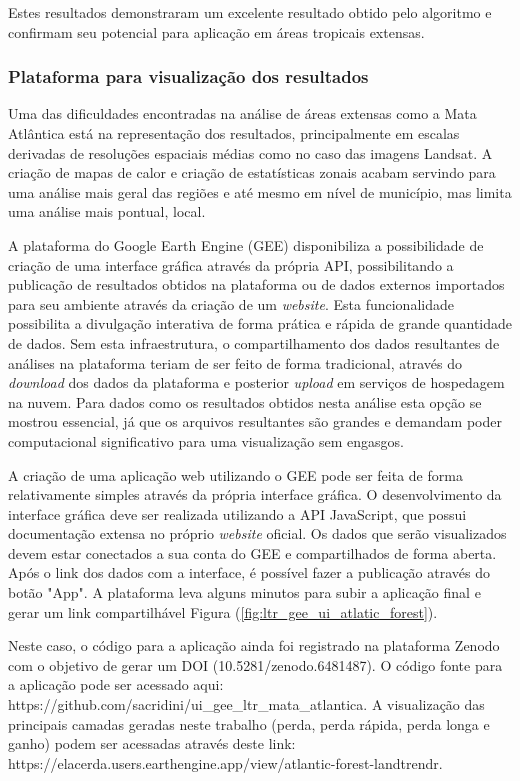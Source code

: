 Estes resultados demonstraram um excelente resultado obtido pelo algoritmo e confirmam seu potencial para aplicação em áreas tropicais extensas.

\subsubsection{Plataforma para visualização dos resultados}

\hspace{13pt} Uma das dificuldades encontradas na análise de áreas extensas como a Mata Atlântica está na representação dos resultados, principalmente em escalas derivadas de resoluções espaciais médias como no caso das imagens Landsat. A criação de mapas de calor e criação de estatísticas zonais acabam servindo para uma análise mais geral das regiões e até mesmo em nível de município, mas limita uma análise mais pontual, local.

A plataforma do Google Earth Engine (GEE) disponibiliza a possibilidade de criação de uma interface gráfica através da própria API, possibilitando a publicação de resultados obtidos na plataforma ou de dados externos importados para seu ambiente através da criação de um \textit{website}. Esta funcionalidade possibilita a divulgação interativa de forma prática e rápida de grande quantidade de dados. Sem esta infraestrutura, o compartilhamento dos dados resultantes de análises na plataforma teriam de ser feito de forma tradicional, através do \textit{download} dos dados da plataforma e posterior \textit{upload} em serviços de hospedagem na nuvem. Para dados como os resultados obtidos nesta análise esta opção se mostrou essencial, já que os arquivos resultantes são grandes e demandam poder computacional significativo para uma visualização sem engasgos. 

A criação de uma aplicação web utilizando o GEE pode ser feita de forma relativamente simples através da própria interface gráfica. O desenvolvimento da interface gráfica deve ser realizada utilizando a API JavaScript, que possui documentação extensa no próprio \textit{website} oficial. Os dados que serão visualizados devem estar conectados a sua conta do GEE e compartilhados de forma aberta. Após o link dos dados com a interface, é possível fazer a publicação através do botão "App". A plataforma leva alguns minutos para subir a aplicação final e gerar um link compartilhável Figura (\ref{fig:ltr_gee_ui_atlatic_forest}). 

Neste caso, o código para a aplicação ainda foi registrado na plataforma Zenodo com o objetivo de gerar um DOI (10.5281/zenodo.6481487). O código fonte para a aplicação pode ser acessado aqui: https://github.com/sacridini/ui\_gee\_ltr\_mata\_atlantica. A visualização das principais camadas geradas neste trabalho (perda, perda rápida, perda longa e ganho) podem ser acessadas através deste link: https://elacerda.users.earthengine.app/view/atlantic-forest-landtrendr. 

